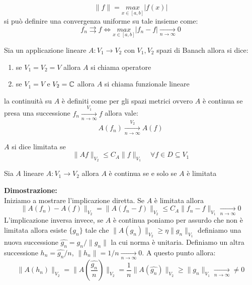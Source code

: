 \[\|f\| = \underset{x\in[a,b]}{max}|f(x)|\]
si può definire una convergenza uniforme su tale insieme come:
\[f_n \rightrightarrows f\iff \underset{x\in[a,b]}{max}|f_n-f|\xrightarrow[n\to \infty]{} 0 \]
\begin{dfn}
Sia un applicazione lineare $A:V_1\to V_2$ con $V_1,V_2$ spazi di Banach allora si dice:
\begin{enumerate}
\item se $V_1=V_2=V$ allora $A$ si chiama operatore
\item se $V_1 = V$ e $V_2=\mathbb{C}$ allora $A$ si chiama funzionale lineare
\end{enumerate}
\end{dfn}
la continuità su $A$ è definiti come per gli spazi metrici ovvero $A$ è continua se presa una successione $f_n\xrightarrow[n\to \infty]{V_1} f$ allora vale:
\[A(f_n) \xrightarrow[n\to \infty]{V_2} A(f)\]
\begin{dfn}
$A$ si dice limitata se
\[\|Af\|_{V_2}\leq C_A\|f\|_{V_1}\quad \forall f\in D\subseteq V_1\]
\end{dfn}
\begin{thm}
Sia $A$ lineare $A:V_1\to V_2$  allora $A$ è continua se e solo se $A$ è limitata
\end{thm}
\hspace{-1.6em}\textbf{Dimostrazione:}\\
Iniziamo a mostrare l'implicazione diretta. Se $A$ è limitata allora
 \[\|A(f_n)-A(f)\|_{V_2} = \|A(f_n-f)\|_{V_2} \leq C_A \|f_n-f\|_{V_1}\xrightarrow[n\to \infty]{} 0 \]
L'implicazione inversa invece, se $A$ è continua poniamo per assurdo che non è limitata allora esiste $\{g_n\}$ tale che $\|A(g_n)\|_{V_2}\geq \eta\|g_n\|_{V_1}$
definiamo una nuova successione $\hat{g_n} = g_n/\|g_n\|$ la cui norma è unitaria. Definiamo un altra successione $h_n = \hat{g_n}/n$, $\|h_n\| = 1/n \xrightarrow[n\to \infty]{} 0$. A questo punto allora:
\[\|A(h_n)\|_{V_2} = \|A\left(\frac{\hat{g_n}}{n}\right)\|_{V_2} = \frac{1}{n}\|A(\hat{g_n})\|_{V_2}\geq \|g_n\|_{V_1}\xrightarrow[n\to \infty]{} \neq0\]


